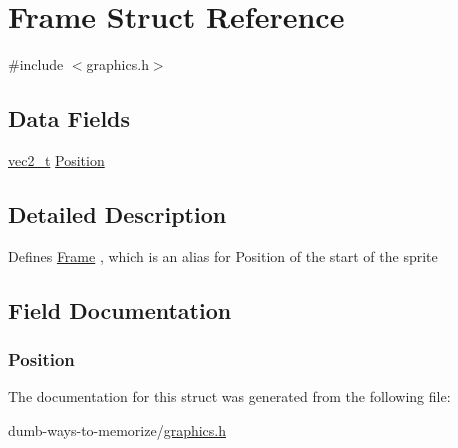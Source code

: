 \hypertarget{struct_frame}{}\section{Frame Struct Reference}
\label{struct_frame}


{\ttfamily \#include $<$graphics.\+h$>$}

\subsection*{Data Fields}
\begin{DoxyCompactItemize}
\item 
\hyperlink{globals_8h_a773f2054819bb6014f1e50baa39cb5e3}{vec2\+\_\+t} \hyperlink{struct_frame_ae69b5c22d5cd3911965dc992d40ba4fc}{Position}
\end{DoxyCompactItemize}


\subsection{Detailed Description}
Defines \hyperlink{struct_frame}{Frame} , which is an alias for Position of the start of the sprite 

\subsection{Field Documentation}
\subsubsection[{\texorpdfstring{Position}{Position}}]{ Position}\hypertarget{struct_frame_ae69b5c22d5cd3911965dc992d40ba4fc}{}\label{struct_frame_ae69b5c22d5cd3911965dc992d40ba4fc}


The documentation for this struct was generated from the following file\+:\begin{DoxyCompactItemize}
\item 
dumb-\/ways-\/to-\/memorize/\hyperlink{graphics_8h}{graphics.\+h}\end{DoxyCompactItemize}
